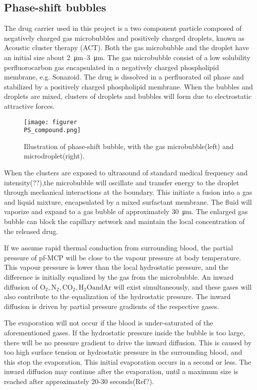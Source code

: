 \subsection{Phase-shift bubbles}
The drug carrier used in this project is a two component particle composed of negatively charged gas microbubbles and positively charged droplets, known as Acoustic cluster therapy (ACT). Both the gas microbubble and the droplet have an initial size about \SIrange{2}{3}{\micro\metre}. The gas microbubble consist of a low solubility perfluorocarbon gas encapsulated in a negatively charged phospholipid membrane, e.g. Sonazoid\texttrademark. The drug is dissolved in a perfluorated oil phase and stabilized by a positively charged phospholipid membrane. When the bubbles and droplets are mixed, clusters of droplets and bubbles will form due to electrostatic attractive forces.


\begin{figure}[h]
  \centering
  \label{Fig:Sonazoid}
  \texttt{[image: figurer\\PS\_compound.png]}
  \caption{Illustration of phase-shift bubble, with the gas microbubble(left) and microdroplet(right).}
\end{figure}


When the clusters are exposed to ultrasound of standard medical frequency and intensity(??),the microbubble will oscillate and transfer energy to the droplet through mechanical interactions at the boundary. This initiate a fusion into a gas and liquid mixture, encapsulated by a mixed surfactant membrane. The fluid will vaporize and expand to a gas bubble of approximately \SI{30}{\micro\metre}. The enlarged gas bubble can block the capillary network and maintain the local concentration of the released drug. 

If we assume rapid thermal conduction from surrounding blood, the partial pressure of pf-MCP will be close to the vapour pressure at body temperature. This vapour pressure is lower than the local hydrostatic pressure, and the difference is initially equalized by the gas from the microbubble. An inward diffusion of $\mathrm{O_2, N_2, CO_2, H_2O and Ar}$ will exist simultaneously, and these gases will also contribute to the equalization of the hydrostatic pressure. The inward diffusion is driven by partial pressure gradients of the respective gases. 

The evaporation will not occur if the blood is under-saturated of the aforementioned gases. If the hydrostatic pressure inside the bubble is too large, there will be no pressure gradient to drive the inward diffusion. This is caused by too high surface tension or hydrostatic pressure in the surrounding blood, and this stop the evaporation. This initial evaporation occurs in a second or less\cite{Healey2013}. The inward diffusion may continue after the evaporation, until a maximum size is reached after approximately 20-30 seconds(Ref?).

